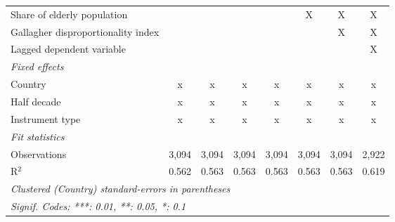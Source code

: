 \begin{tabular}{lccccccc}
   Share of elderly population                                            &                &               &               &               & X             & X             & X\\  
   Gallagher disproportionality index                                     &                &               &               &               &               & X             & X\\  
   Lagged dependent variable                                              &                &               &               &               &               &               & X\\  
   \emph{Fixed effects}\\
   Country                                                                & x              & x             & x             & x             & x             & x             & x\\  
   Half decade                                                            & x              & x             & x             & x             & x             & x             & x\\  
   Instrument type                                                        & x              & x             & x             & x             & x             & x             & x\\  
   \midrule \emph{Fit statistics}\\
   Observations                                                           & 3,094          & 3,094         & 3,094         & 3,094         & 3,094         & 3,094         & 2,922\\  
   R$^2$                                                                  & 0.562          & 0.563         & 0.563         & 0.563         & 0.563         & 0.563         & 0.619\\  
   \midrule
   \multicolumn{8}{l}{\emph{Clustered (Country) standard-errors in parentheses}}\\
   \multicolumn{8}{l}{\emph{Signif. Codes: ***: 0.01, **: 0.05, *: 0.1}}\\
\end{tabular}
\par\endgroup



